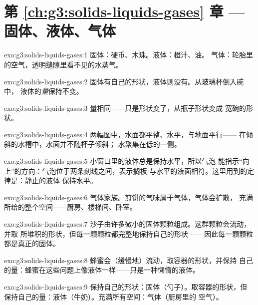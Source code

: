 \section*{第 \ref{ch:g3:solids-liquids-gases} 章 --- 固体、液体、气体}

\begin{solution}{exo:g3:solids-liquids-gases:1}
固体：硬币、木珠。液体：橙汁、油。
气体：轮胎里的空气，透明缝隙里看不见的水蒸气。
\end{solution}

\begin{solution}{exo:g3:solids-liquids-gases:2}
固体有自己的形状，液体则没有。从玻璃杯倒入碗中，
液体的\emph{量}保持不变。
\end{solution}

\begin{solution}{exo:g3:solids-liquids-gases:3}
量相同——只是形状变了，从瓶子形状变成
宽碗的形状。
\end{solution}

\begin{solution}{exo:g3:solids-liquids-gases:4}
两幅图中，水面都平整、水平，与地面平行——
在倾斜的水槽中，水面并不随杯子倾斜；
水聚集在低的一侧。
\end{solution}

\begin{solution}{exo:g3:solids-liquids-gases:5}
小窗口里的液体总是保持水平，所以气泡
能指示“向上”的方向：气泡位于两条刻线之间，表示搁板
与水平的液面相符。这里用到的定律是：静止的液体
保持水平。
\end{solution}

\begin{solution}{exo:g3:solids-liquids-gases:6}
气体家族。煎饼的气味属于气体，气体会扩散，
充满所给的整个空间——厨房、楼梯间、卧室。
\end{solution}

\begin{solution}{exo:g3:solids-liquids-gases:7}
沙子由许多微小的固体颗粒组成。这群颗粒会流动，并取
所堆积的形状，但每一颗颗粒都完整地保持自己的形状——
因此每一颗颗粒都是真正的固体。
\end{solution}

\begin{solution}{exo:g3:solids-liquids-gases:8}
蜂蜜会（缓慢地）流动，取容器的形状，并保持
自己的量：蜂蜜在这些问题上像液体一样——只是一种懒惰的液体。
\end{solution}

\begin{solution}{exo:g3:solids-liquids-gases:9}
保持自己的形状：固体（勺子）。取容器的形状，但
保持自己的量：液体（牛奶）。充满所有空间：气体（厨房里的
空气）。
\end{solution}

